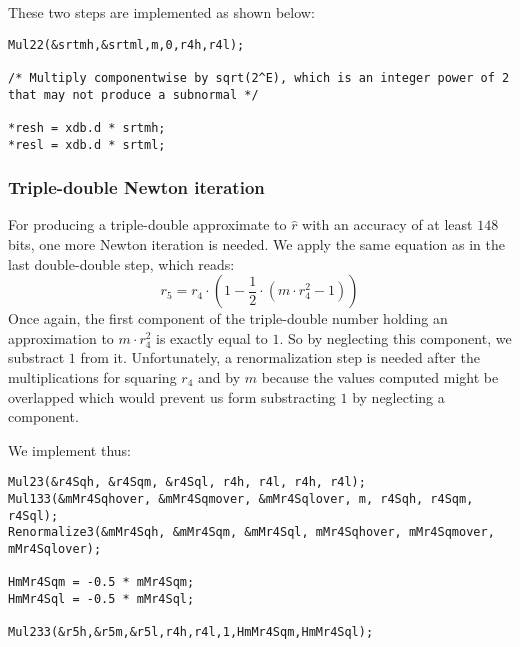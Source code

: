 These two steps are implemented as shown below:
\begin{lstlisting}[caption={Multiplication $m \cdot \hat{r}$, reconstruction},firstnumber=1]
Mul22(&srtmh,&srtml,m,0,r4h,r4l);

/* Multiply componentwise by sqrt(2^E), which is an integer power of 2 that may not produce a subnormal */

*resh = xdb.d * srtmh;
*resl = xdb.d * srtml;
\end{lstlisting}

\subsubsection{Triple-double Newton iteration}
For producing a triple-double approximate to $\hat{r}$ with an
accuracy of at least $148$ bits, one more Newton iteration is
needed. We apply the same equation as in the last double-double step,
which reads:
$$r_5 = r_4 \cdot \left( 1 - \frac{1}{2} \cdot \left( m \cdot r_4^2 -
1 \right) \right)$$ Once again, the first component of the
triple-double number holding an approximation to $m \cdot r_4^2$ is
exactly equal to $1$. So by neglecting this component, we substract $1$ from it.
Unfortunately, a renormalization step is needed after the multiplications for
squaring $r_4$ and by $m$ because the values computed might be overlapped which would prevent us
form substracting $1$ by neglecting a component.

We implement thus:
\begin{lstlisting}[caption={Newton iteration - triple-double step},firstnumber=1]
Mul23(&r4Sqh, &r4Sqm, &r4Sql, r4h, r4l, r4h, r4l);                               
Mul133(&mMr4Sqhover, &mMr4Sqmover, &mMr4Sqlover, m, r4Sqh, r4Sqm, r4Sql);        
Renormalize3(&mMr4Sqh, &mMr4Sqm, &mMr4Sql, mMr4Sqhover, mMr4Sqmover, mMr4Sqlover);
                                                                                                                 
HmMr4Sqm = -0.5 * mMr4Sqm;                                                            
HmMr4Sql = -0.5 * mMr4Sql;                                                            
                                                                                        
Mul233(&r5h,&r5m,&r5l,r4h,r4l,1,HmMr4Sqm,HmMr4Sql);                              
\end{lstlisting}

